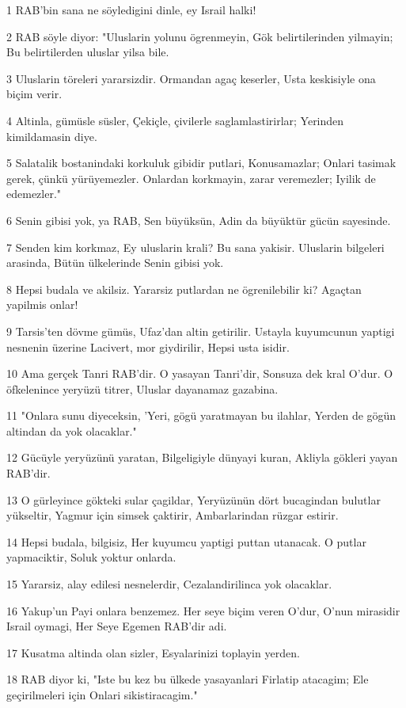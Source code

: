 \par 1 RAB'bin sana ne söyledigini dinle, ey Israil halki!
\par 2 RAB söyle diyor: "Uluslarin yolunu ögrenmeyin, Gök belirtilerinden yilmayin; Bu belirtilerden uluslar yilsa bile.
\par 3 Uluslarin töreleri yararsizdir. Ormandan agaç keserler, Usta keskisiyle ona biçim verir.
\par 4 Altinla, gümüsle süsler, Çekiçle, çivilerle saglamlastirirlar; Yerinden kimildamasin diye.
\par 5 Salatalik bostanindaki korkuluk gibidir putlari, Konusamazlar; Onlari tasimak gerek, çünkü yürüyemezler. Onlardan korkmayin, zarar veremezler; Iyilik de edemezler."
\par 6 Senin gibisi yok, ya RAB, Sen büyüksün, Adin da büyüktür gücün sayesinde.
\par 7 Senden kim korkmaz, Ey uluslarin krali? Bu sana yakisir. Uluslarin bilgeleri arasinda, Bütün ülkelerinde Senin gibisi yok.
\par 8 Hepsi budala ve akilsiz. Yararsiz putlardan ne ögrenilebilir ki? Agaçtan yapilmis onlar!
\par 9 Tarsis'ten dövme gümüs, Ufaz'dan altin getirilir. Ustayla kuyumcunun yaptigi nesnenin üzerine Lacivert, mor giydirilir, Hepsi usta isidir.
\par 10 Ama gerçek Tanri RAB'dir. O yasayan Tanri'dir, Sonsuza dek kral O'dur. O öfkelenince yeryüzü titrer, Uluslar dayanamaz gazabina.
\par 11 "Onlara sunu diyeceksin, 'Yeri, gögü yaratmayan bu ilahlar, Yerden de gögün altindan da yok olacaklar."
\par 12 Gücüyle yeryüzünü yaratan, Bilgeligiyle dünyayi kuran, Akliyla gökleri yayan RAB'dir.
\par 13 O gürleyince gökteki sular çagildar, Yeryüzünün dört bucagindan bulutlar yükseltir, Yagmur için simsek çaktirir, Ambarlarindan rüzgar estirir.
\par 14 Hepsi budala, bilgisiz, Her kuyumcu yaptigi puttan utanacak. O putlar yapmaciktir, Soluk yoktur onlarda.
\par 15 Yararsiz, alay edilesi nesnelerdir, Cezalandirilinca yok olacaklar.
\par 16 Yakup'un Payi onlara benzemez. Her seye biçim veren O'dur, O'nun mirasidir Israil oymagi, Her Seye Egemen RAB'dir adi.
\par 17 Kusatma altinda olan sizler, Esyalarinizi toplayin yerden.
\par 18 RAB diyor ki, "Iste bu kez bu ülkede yasayanlari Firlatip atacagim; Ele geçirilmeleri için Onlari sikistiracagim."
